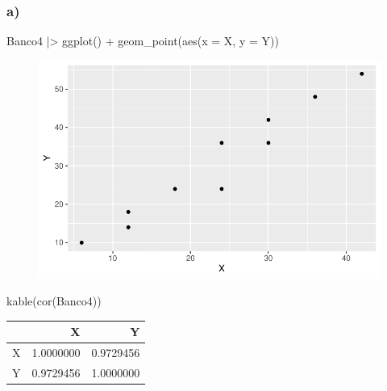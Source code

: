 \documentclass[
  letterpaper,
  DIV=11,
  numbers=noendperiod]{scrartcl}
\newenvironment{Shaded}{\begin{snugshade}}{\end{snugshade}}
\newcommand{\AttributeTok}[1]{\textcolor[rgb]{0.40,0.45,0.13}{#1}}
\newcommand{\FunctionTok}[1]{\textcolor[rgb]{0.28,0.35,0.67}{#1}}
\newcommand{\NormalTok}[1]{\textcolor[rgb]{0.00,0.23,0.31}{#1}}
\newcommand{\SpecialCharTok}[1]{\textcolor[rgb]{0.37,0.37,0.37}{#1}}
\begin{document}
\hypertarget{a-1}{%
\subsubsection{a)}\label{a-1}}

\begin{Shaded}
\begin{Highlighting}[]
\NormalTok{Banco4 }\SpecialCharTok{|\textgreater{}}
  \FunctionTok{ggplot}\NormalTok{() }\SpecialCharTok{+}
  \FunctionTok{geom\_point}\NormalTok{(}\FunctionTok{aes}\NormalTok{(}\AttributeTok{x =}\NormalTok{ X, }\AttributeTok{y =}\NormalTok{ Y))}
\end{Highlighting}
\end{Shaded}

\begin{figure}[H]

{\centering \includegraphics{trabalho_amostragem_files/figure-pdf/unnamed-chunk-8-1.pdf}

}

\end{figure}

\begin{Shaded}
\begin{Highlighting}[]
\FunctionTok{kable}\NormalTok{(}\FunctionTok{cor}\NormalTok{(Banco4))}
\end{Highlighting}
\end{Shaded}

\begin{longtable}[]{@{}lrr@{}}
\toprule()
& X & Y \\
\midrule()
\endhead
X & 1.0000000 & 0.9729456 \\
Y & 0.9729456 & 1.0000000 \\
\bottomrule()
\end{longtable}
\end{document}

